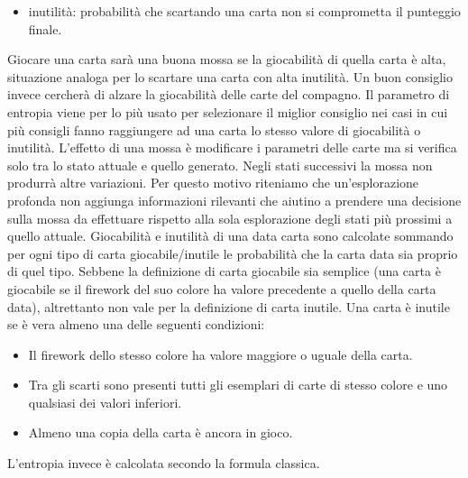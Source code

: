 \documentclass{article}
\begin{document}
\begin{flushleft}
\begin{itemize}
    \item inutilità: probabilità che scartando una carta non si comprometta il punteggio finale.
\end{itemize}
Giocare una carta sarà una buona mossa se la giocabilità di quella carta è alta, situazione analoga per lo scartare una carta con alta inutilità. Un buon consiglio invece cercherà di alzare la giocabilità delle carte del compagno. Il parametro di entropia viene per lo più usato per selezionare il miglior consiglio nei casi in cui più consigli fanno raggiungere ad una carta lo stesso valore di giocabilità o inutilità.\newline
\newline
L'effetto di una mossa è modificare i parametri delle carte ma si verifica solo tra lo stato attuale e quello generato. Negli stati successivi la mossa non produrrà altre variazioni.\newline
Per questo motivo riteniamo che un'esplorazione profonda non aggiunga informazioni rilevanti che aiutino a prendere una decisione sulla mossa da effettuare rispetto alla sola esplorazione degli stati più prossimi a quello attuale. \newline
\newline
Giocabilità e inutilità di una data carta sono calcolate sommando per ogni tipo di carta giocabile/inutile le probabilità che la carta data sia proprio di quel tipo. \newline
Sebbene la definizione di carta giocabile sia semplice (una carta è giocabile se il firework del suo colore ha valore precedente a quello della carta data), altrettanto non vale per la definizione di carta inutile. Una carta è inutile se è vera almeno una delle seguenti condizioni:
\begin{itemize}
    \item Il firework dello stesso colore ha valore maggiore o uguale della carta.
    \item Tra gli scarti sono presenti tutti gli esemplari di carte di stesso colore e uno qualsiasi dei valori inferiori.
    \item Almeno una copia della carta è ancora in gioco.
\end{itemize}
\end{flushleft}
L'entropia invece è calcolata secondo la formula classica.
\end{document}
